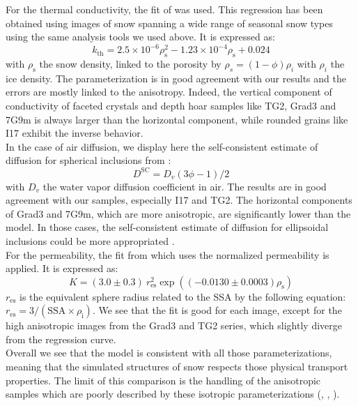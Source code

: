 \documentclass[draft,ms]{agujournal2019}
\begin{document}
 For the thermal conductivity, the fit of  was used. This regression has been obtained using images of snow spanning a wide range of seasonal snow types using the same analysis tools we used above. It is expressed as:
\begin{equation}k_{\mathrm{th}}=2.5 \times 10^{-6} \rho_{\mathrm{s}}^{2}-1.23 \times 10^{-4} \rho_{\mathrm{s}}+0.024\end{equation}
with $\rho_{\mathrm{s}}$ the snow density, linked to the porosity by $\rho_s = (1 - \phi)\rho_i$ with $\rho_i$ the ice density.
The parameterization is in good agreement with our results and the errors are mostly linked to the anisotropy. Indeed, the vertical component of conductivity of faceted crystals and depth hoar samples like TG2, Grad3 and 7G9m is always larger than the horizontal component, while rounded grains like I17 exhibit the inverse behavior.\\

In the case of air diffusion, we display here the self-consistent estimate of diffusion for spherical inclusions from :
\begin{equation}
    D^{\mathrm{SC}} = D_v(3\phi - 1)/2
\end{equation}
with $D_v$ the water vapor diffusion coefficient in air. The results are in good agreement with our samples, especially I17 and TG2. The horizontal components of Grad3 and 7G9m, which are more anisotropic, are significantly lower than the model. In those cases, the self-consistent estimate of diffusion for ellipsoidal inclusions could be more appropriated \cite{calonne_numerical_2011}.\\

 For the permeability, the fit from  which uses the normalized permeability is applied. It is expressed as:
\begin{equation}K=(3.0 \pm 0.3)\ r_{\mathrm{es}}^{2} \exp \left((-0.0130 \pm 0.0003) \rho_{\mathrm{s}}\right)\end{equation}
$r_{\mathrm{es}}$ is the equivalent sphere radius related to the SSA by the following equation: $r_{\mathrm{es}}=3/(\mathrm{SSA} \times \rho_{\mathrm{i}})$.
We see that the fit is good for each image, except for the high anisotropic images from the Grad3 and TG2 series, which slightly diverge from the regression curve.\\

Overall we see that the model is consistent with all those parameterizations, meaning that the simulated structures of snow respects those physical transport properties. The limit of this comparison is the handling of the anisotropic samples which are poorly described by these isotropic parameterizations (, , ). 
\end{document}
